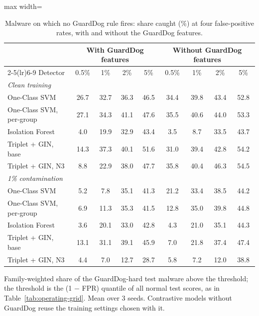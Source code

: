 \begin{table}[htbp]
\centering
\footnotesize
\caption{Malware on which no GuardDog rule fires: share caught (\%) at four false-positive rates, with and without the GuardDog features.}
\label{tab:hard-ops}
\begin{adjustbox}{max width=\linewidth}
\begin{tabular}{lcccccccc}
\toprule
& \multicolumn{4}{c}{With GuardDog features} & \multicolumn{4}{c}{Without GuardDog features} \\ \cmidrule(lr){2-5}\cmidrule(lr){6-9} Detector & 0.5\% & 1\% & 2\% & 5\% & 0.5\% & 1\% & 2\% & 5\% \\
\midrule
\multicolumn{9}{l}{\textit{Clean training}} \\
One-Class SVM & 26.7 & 32.7 & 36.3 & 46.5 & 34.4 & 39.8 & 43.4 & 52.8 \\
One-Class SVM, per-group & 27.1 & 34.3 & 41.1 & 47.6 & 35.5 & 40.6 & 44.0 & 53.3 \\
Isolation Forest & 4.0 & 19.9 & 32.9 & 43.4 & 3.5 & 8.7 & 33.5 & 43.7 \\
Triplet + GIN, base & 14.3 & 37.3 & 40.1 & 51.6 & 31.0 & 39.4 & 42.8 & 54.2 \\
Triplet + GIN, N3 & 8.8 & 22.9 & 38.0 & 47.7 & 35.8 & 40.4 & 46.3 & 54.5 \\
\midrule
\multicolumn{9}{l}{\textit{1\% contamination}} \\
One-Class SVM & 5.2 & 7.8 & 35.1 & 41.3 & 21.2 & 33.4 & 38.5 & 44.2 \\
One-Class SVM, per-group & 6.9 & 11.3 & 35.3 & 41.5 & 12.8 & 35.0 & 39.8 & 44.8 \\
Isolation Forest & 3.6 & 20.1 & 33.0 & 42.8 & 4.3 & 21.0 & 35.1 & 44.3 \\
Triplet + GIN, base & 13.1 & 31.1 & 39.1 & 45.9 & 7.0 & 21.8 & 37.4 & 47.4 \\
Triplet + GIN, N3 & 4.4 & 7.0 & 12.7 & 28.7 & 5.8 & 7.2 & 12.0 & 38.8 \\
\bottomrule
\end{tabular}
\end{adjustbox}
\par\smallskip
\parbox{0.95\linewidth}{\footnotesize Family-weighted share of the GuardDog-hard test malware above the threshold; the threshold is the (1 $-$ FPR) quantile of all normal test scores, as in Table~\ref{tab:operating-grid}. Mean over 3 seeds. Contrastive models without GuardDog reuse the training settings chosen with it.}
\end{table}
